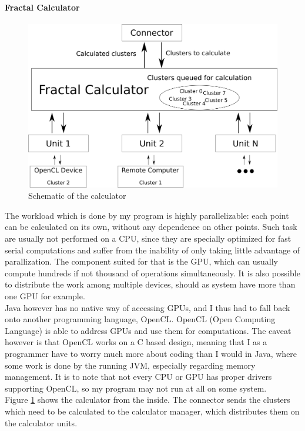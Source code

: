 \documentclass[10pt,a4paper,titlepage]{article}
\begin{document}
	\paragraph{Fractal Calculator}
	\begin{figure}
		\caption{Schematic of the calculator}
		\label{fig:calculator_schematic}
		\centering
		\includegraphics[width=\textwidth]{res/images/calculator.png}
	\end{figure}
	The workload which is done by my program is highly parallelizable: each point can be calculated on its own, without any dependence on other points. Such task are usually not performed on a CPU, since they are specially optimized for fast serial computations and suffer from the inability of only taking little advantage of parallization. The component suited for that is the GPU, which can usually compute hundreds if not thousand of operations simultaneously. It is also possible to distribute the work among multiple devices, should as system have more than one GPU for example.\\
	Java however has no native way of accessing GPUs, and I thus had to fall back onto another programming language, OpenCL. OpenCL (Open Computing Language) is able to address GPUs and use them for computations. The caveat however is that OpenCL works on a C based design, meaning that I as a programmer have to worry much more about coding than I would in Java, where some work is done by the running JVM, especially regarding memory management. It is to note that not every CPU or GPU has proper drivers supporting OpenCL, so my program may not run at all on some system.\\
	Figure \ref{fig:calculator_schematic} shows the calculator from the inside. The connector sends the clusters which need to be calculated to the calculator manager, which distributes them on the calculator units.
\end{document}
